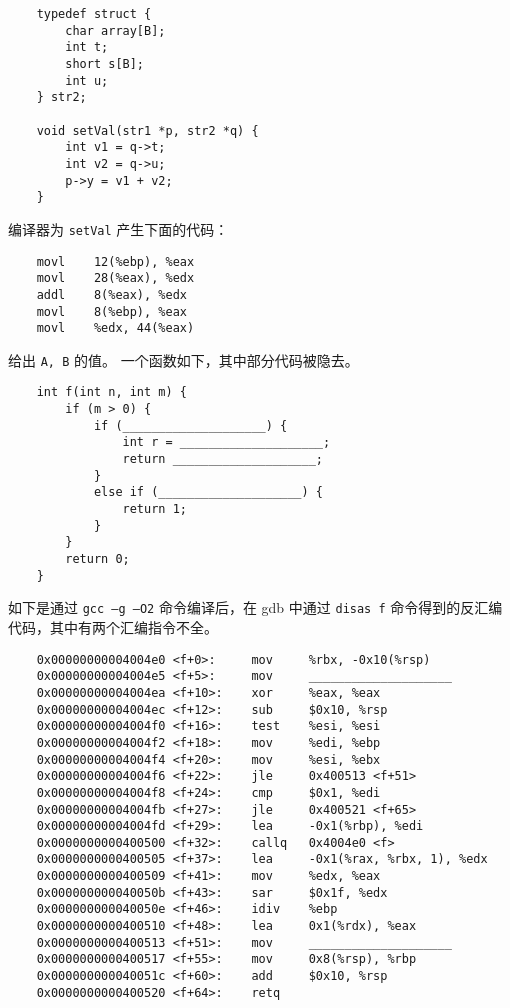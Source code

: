 \begin{problems}
\begin{verbatim}
    typedef struct {
        char array[B];
        int t;
        short s[B];
        int u;
    } str2;

    void setVal(str1 *p, str2 *q) {
        int v1 = q->t;
        int v2 = q->u;
        p->y = v1 + v2;
    }
        \end{verbatim}
        编译器为 \verb|setVal| 产生下面的代码：
        \begin{verbatim}
    movl    12(%ebp), %eax
    movl    28(%eax), %edx
    addl    8(%eax), %edx
    movl    8(%ebp), %eax
    movl    %edx, 44(%eax)
        \end{verbatim}
        给出 \verb|A, B| 的值。
         一个函数如下，其中部分代码被隐去。
        \begin{verbatim}
    int f(int n, int m) {
        if (m > 0) {
            if (____________________) {
                int r = ____________________;
                return ____________________;
            }
            else if (____________________) {
                return 1;
            }
        }
        return 0;
    }
        \end{verbatim}
        如下是通过 \verb|gcc –g –O2| 命令编译后，在 gdb 中通过 \verb|disas f| 命令得到的反汇编代码，其中有两个汇编指令不全。
        \begin{verbatim}
    0x00000000004004e0 <f+0>:     mov     %rbx, -0x10(%rsp)
    0x00000000004004e5 <f+5>:     mov     ____________________
    0x00000000004004ea <f+10>:    xor     %eax, %eax
    0x00000000004004ec <f+12>:    sub     $0x10, %rsp
    0x00000000004004f0 <f+16>:    test    %esi, %esi
    0x00000000004004f2 <f+18>:    mov     %edi, %ebp
    0x00000000004004f4 <f+20>:    mov     %esi, %ebx
    0x00000000004004f6 <f+22>:    jle     0x400513 <f+51>
    0x00000000004004f8 <f+24>:    cmp     $0x1, %edi
    0x00000000004004fb <f+27>:    jle     0x400521 <f+65>
    0x00000000004004fd <f+29>:    lea     -0x1(%rbp), %edi
    0x0000000000400500 <f+32>:    callq   0x4004e0 <f>
    0x0000000000400505 <f+37>:    lea     -0x1(%rax, %rbx, 1), %edx
    0x0000000000400509 <f+41>:    mov     %edx, %eax
    0x000000000040050b <f+43>:    sar     $0x1f, %edx
    0x000000000040050e <f+46>:    idiv    %ebp
    0x0000000000400510 <f+48>:    lea     0x1(%rdx), %eax
    0x0000000000400513 <f+51>:    mov     ____________________
    0x0000000000400517 <f+55>:    mov     0x8(%rsp), %rbp
    0x000000000040051c <f+60>:    add     $0x10, %rsp
    0x0000000000400520 <f+64>:    retq

\end{verbatim}
\end{problems}
